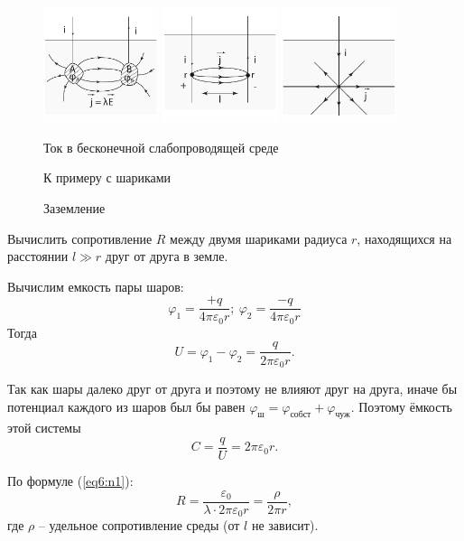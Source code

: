     \begin{figure}[b!]
        \center
        \includegraphics[width=0.3\textwidth]{lec06/inf_environment.pdf}
        \hfill
        \includegraphics[width=0.3\textwidth]{lec06/2_balls.pdf}
        \hfill
        \includegraphics[width=0.3\textwidth]{lec06/ground.pdf}
        \parbox[t]{.3\textwidth}{\caption{Ток в бесконечной слабопроводящей
                                                                    среде}}
        \parbox[t]{.3\textwidth}{\caption{К примеру с шариками}}
        \parbox[t]{.3\textwidth}{\caption{Заземление}}
    \end{figure}
    
    \begin{example}
        Вычислить сопротивление \( R \) между двумя шариками радиуса \( r \),
        находящихся на расстоянии \( l \gg r \) друг от друга в земле.
    \end{example}
    
    \begin{solution}
        Вычислим емкость пары шаров:
        \[
            \varphi_1 = \frac{+q}{4\pi\varepsilon_0 r};\ 
            \varphi_2 = \frac{-q}{4\pi\varepsilon_0 r}
        \]
        Тогда
        \[
            U = \varphi_1 - \varphi_2 = \frac{q}{2\pi\varepsilon_0 r}.
        \]
        
        Так как шары далеко друг от друга и поэтому не влияют друг на друга, иначе
        бы потенциал каждого из шаров был бы равен \( \varphi_{\textit{ш}} =
        \varphi_{\textit{собст}} + \varphi_{\textit{чуж}} \). Поэтому ёмкость этой
        системы
        \[
            C = \frac{q}{U} = 2\pi\varepsilon_0 r.
        \]
        
        По формуле (\ref{eq6:n1}):
        \[
            R = \frac{\varepsilon_0}{\lambda\cdot 2\pi\varepsilon_0 r} =
            \frac{\rho}{2\pi r},
        \]
        где \( \rho \) -- удельное сопротивление среды (от \( l \) не зависит).
    \end{solution}
    
